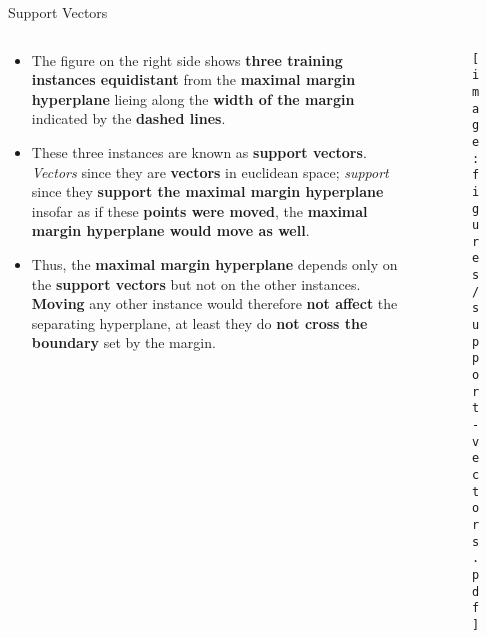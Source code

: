 \documentclass[document.tex]{subfiles}
\begin{document}
    \begin{frame}{Support Vectors}
        \begin{columns}
            \begin{column}{0.6\textwidth}
                \begin{itemize}
                    \item The figure on the right side shows \textbf{three training instances equidistant} from the \textbf{maximal margin hyperplane} lieing along the \textbf{width of the margin} indicated by the \textbf{dashed lines}.
                    \item These three instances are known as \textbf{support vectors}. \textit{Vectors} since they are \textbf{vectors} in euclidean space; \textit{support} since they \textbf{support the maximal margin hyperplane} insofar as if these \textbf{points were moved}, the \textbf{maximal margin hyperplane would move as well}.
                    \item Thus, the \textbf{maximal margin hyperplane} depends only on the \textbf{support vectors} but not on the other instances. \textbf{Moving} any other instance would therefore \textbf{not affect} the separating hyperplane, at least they do \textbf{not cross the boundary} set by the margin.
                \end{itemize}
            \end{column}
            \begin{column}{0.4\textwidth}
                \begin{figure}
                    \label{fig:support-vectors}
                    \texttt{[image: figures/support-vectors.pdf]}
                \end{figure}
            \end{column}
        \end{columns}
    \end{frame}
    
\end{document}
